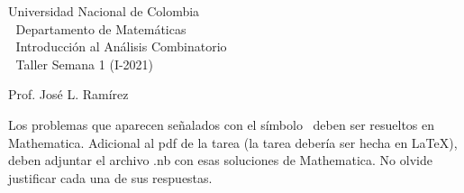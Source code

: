 \documentclass[12pt, oneside]{article}%
\begin{document}
\setlength{\parindent}{0cm}%
\hoffset-0.46cm
\voffset-1.46cm

\begin{window}
\Large  \hspace{0.5cm}\textsf{Universidad Nacional de Colombia} \\
\textcolor{white}{\tiny.}  \Large \hspace{0.6cm} \textsf{Departamento de Matemáticas} \\
\textcolor{white}{\tiny.}   \large\hspace{0.5cm}\textsf{Introducción al Análisis Combinatorio}\\
\textcolor{white}{\tiny.}   \large \hspace{6.5cm}\textsf{Taller Semana 1} \normalsize (I-2021)\\
\end{window}

\vspace{0.5cm}
\normalfont
\textsf{Prof. José L. Ramírez} 
\normalsize
\dotfill



Los problemas que aparecen señalados con el símbolo \manimpossiblecube  \ deben ser resueltos en \textsf{Mathematica}. Adicional al pdf de la tarea (la tarea debería ser hecha en \LaTeX), deben adjuntar el archivo .nb con esas soluciones de \textsf{Mathematica}. No olvide justificar cada una de sus respuestas. 
\end{document}
